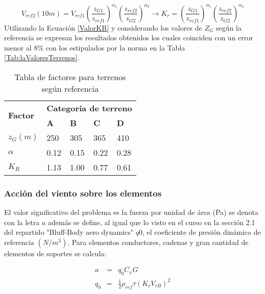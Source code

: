 \begin{equation}\label{ValorKR}
	V_{ref2}(10m)=V_{ref1}\left(\frac{z_{G1}}{z_{ref1}}\right)^{\alpha_1}\left(\frac{z_{ref2}}{z_{G2}}\right)^{\alpha_2}\rightarrow K_r=\left(\frac{z_{G1}}{z_{ref1}}\right)^{\alpha_1}\left(\frac{z_{ref2}}{z_{G2}}\right)^{\alpha_2}
\end{equation}
Utilizando la Ecuación \ref{ValorKR}  y considerando los valores de $Z_G$ según la referencia \cite{Oke2000} se expresan los resultados obtenidos los cuales coinciden con un error menor al $8\%$ con los estipulados por la norma en la Tabla \ref{Tab:laValoresTerrenos}.

\begin{table}[h] 
	\begin{footnotesize} 
		\begin{center} 
			\begin{tabular}{ |p{3cm}|p{2cm}|p{2cm}|p{2cm}|p{2cm}|} \hline
				\multirow{2}{*}{\textbf{Factor}}  & \multicolumn{4}{|c|}{ \textbf{Categoría de terreno} }  \\ 
				& \textbf{A}& \textbf{B} &\textbf{C}&\textbf{D}\\
				\hline
				$z_G(m)$   & 250     &305&  365 &410\\ \hline
				$\alpha$& 0.12  & 0.15 & 0.22 &0.28\\ \hline
				$K_R$ & 1.13 &1.00 &0.77&  0.61\\ \hline
			\end{tabular}
		\end{center} 
		\caption{Tabla de factores para terrenos según referencia \cite{Davenport1960} }
	\end{footnotesize} 
	\label{TablaValoresTerrenos} 
\end{table}

\subsubsection{Acción del viento sobre los elementos}

El valor significativo del problema es la fuerza por unidad de área (Pa) se denota con la letra $a$ además se define, al igual que lo visto en el curso en la sección 2.1 del repartido "Bluff-Body aero dynamics"  $q0$, el coeficiente de presión dinámica de referencia $(N/m^3)$. Para elementos conductores, cadenas y gran cantidad de elementos de soportes se calcula:

\begin{eqnarray} \label{CoficienteDin1}  
	a&=&q_0C_xG \\\label{CoefDin2}
	q_0&=&\frac{1}{2}\rho_{ref} \tau \left ( K_rV_{rB}\right )^{2}
\end{eqnarray}

